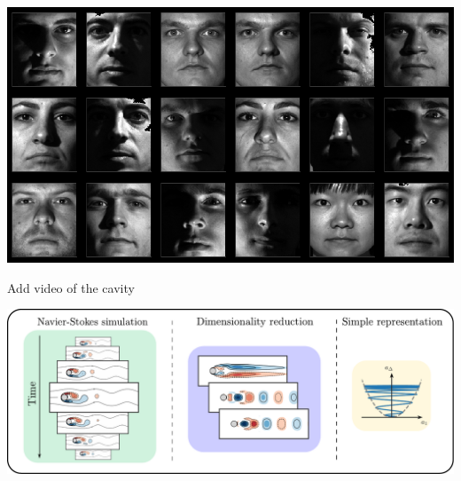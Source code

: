 \documentclass[aspectratio=169, usenames, dvipsnames]{beamer}
\begin{document}
\begin{frame}
  \centering
  \vfill
  \includegraphics[width=\textwidth]{example_images}
  \vfill
\end{frame}

\begin{frame}
  Add video of the cavity
\end{frame}


{

\begin{frame}%
  \vfill
  \centering

  \includegraphics[width=\textwidth]{reduced_order_modeling}
  \vfill
\end{frame}

}
\end{document}
